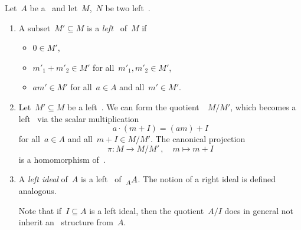 \begin{remarkdefinition}
  Let~$A$ be a~{\kalg} and let~$M$,~$N$ be two left~{\Amods}.
  \begin{enumerate}
    \item
      A subset~$M' \subseteq M$ is a \emph{left~{\Asmod}} of~$M$ if
      \begin{itemize}
        \item
          $0 \in M'$,
        \item
          $m'_1 + m'_2 \in M'$ for all~$m'_1, m'_2 \in M'$,
        \item
          $a m' \in M'$ for all~$a \in A$ and all~$m' \in M'$.
      \end{itemize}
    \item
      Let~$M' \subseteq M$ be a left~{\Asmod}.
      We can form the quotient~{\kmod}~$M/M'$, which becomes a left~{\Amod} via the scalar multiplication
      \[
          a \cdot (m + I)
        = (am) + I
      \]
      for all~$a \in A$ and all~$m + I \in M/M'$.
      The canonical projection
      \[
                \pi
        \colon  M
        \to     M/M' \,,
        \quad   m
        \mapsto m + I
      \]
      is a homomorphism of~{\Amods}.
    \item
      A \emph{left ideal} of~$A$ is a left~{\Asmod} of~$\prescript{}{A}{A}$.
      The notion of a right ideal is defined analogous.
      
      Note that if~$I \subseteq A$ is a left ideal, then the quotient~$A/I$ does in general not inherit an~{\kalg} structure from~$A$.


\end{enumerate}
\end{remarkdefinition}
